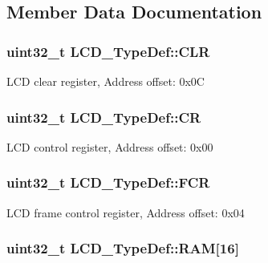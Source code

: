 \subsection{Member Data Documentation}
\hypertarget{struct_l_c_d___type_def_a426998a4ef847067fbc78606e2464e4b}{
\subsubsection[{C\-L\-R}]{ uint32\-\_\-t L\-C\-D\-\_\-\-Type\-Def\-::\-C\-L\-R}}\label{struct_l_c_d___type_def_a426998a4ef847067fbc78606e2464e4b}
L\-C\-D clear register, Address offset\-: 0x0\-C \hypertarget{struct_l_c_d___type_def_a10f3d5e534f8a6f59a2dcf9d897fba22}{
\subsubsection[{C\-R}]{ uint32\-\_\-t L\-C\-D\-\_\-\-Type\-Def\-::\-C\-R}}\label{struct_l_c_d___type_def_a10f3d5e534f8a6f59a2dcf9d897fba22}
L\-C\-D control register, Address offset\-: 0x00 \hypertarget{struct_l_c_d___type_def_a3caccc4b0b894d7b27ed5a4d508154ea}{
\subsubsection[{F\-C\-R}]{ uint32\-\_\-t L\-C\-D\-\_\-\-Type\-Def\-::\-F\-C\-R}}\label{struct_l_c_d___type_def_a3caccc4b0b894d7b27ed5a4d508154ea}
L\-C\-D frame control register, Address offset\-: 0x04 \hypertarget{struct_l_c_d___type_def_adc6718425566b14d2201d6623b91dee4}{
\subsubsection[{R\-A\-M}]{ uint32\-\_\-t L\-C\-D\-\_\-\-Type\-Def\-::\-R\-A\-M\mbox{[}16\mbox{]}}}\label{struct_l_c_d___type_def_adc6718425566b14d2201d6623b91dee4}
